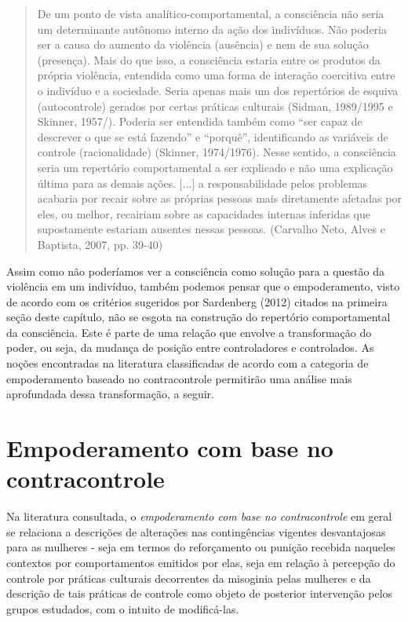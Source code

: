 \begin{quote}
    De um ponto de vista analítico-comportamental, a consciência não seria um determinante autônomo interno da ação dos indivíduos. Não poderia ser a causa do aumento da violência (ausência) e nem de sua solução (presença). Mais do que isso, a consciência estaria entre os produtos da própria violência, entendida como uma forma de interação coercitiva entre o indivíduo e a sociedade. Seria apenas mais um dos repertórios de esquiva (autocontrole) gerados por certas práticas culturais (Sidman, 1989/1995 e Skinner, 1957/). Poderia ser entendida também como ``ser capaz de descrever o que se está fazendo'' e ``porquê'', identificando as variáveis de controle (racionalidade) (Skinner, 1974/1976). Nesse sentido, a consciência seria um repertório comportamental a ser explicado e não uma explicação última para as demais ações. [...] a responsabilidade pelos problemas acabaria por recair sobre as próprias pessoas mais diretamente afetadas por eles, ou melhor, recairiam sobre as capacidades internas inferidas que supostamente estariam ausentes nessas pessoas. (Carvalho Neto, Alves e Baptista, 2007, pp. 39-40)
\end{quote}

Assim como não poderíamos ver a consciência como solução para a questão da violência em um indivíduo, também podemos pensar que o empoderamento, visto de acordo com os critérios sugeridos por Sardenberg (2012) citados na primeira seção deste capítulo, não se esgota na construção do repertório comportamental da consciência. Este é parte de uma relação que envolve a transformação do poder, ou seja, da mudança de posição entre controladores e controlados. As noções encontradas na literatura classificadas de acordo com a categoria de empoderamento baseado no contracontrole permitirão uma análise mais aprofundada dessa transformação, a seguir.

\section*{Empoderamento com base no contracontrole}

Na literatura consultada, o \textit{empoderamento com base no contracontrole} em geral se relaciona a descrições de alterações nas contingências vigentes desvantajosas para as mulheres - seja em termos do reforçamento ou punição recebida naqueles contextos por comportamentos emitidos por elas, seja em relação à percepção do controle por práticas culturais decorrentes da misoginia pelas mulheres e da descrição de tais práticas de controle como objeto de posterior intervenção pelos grupos estudados, com o intuito de modificá-las.

